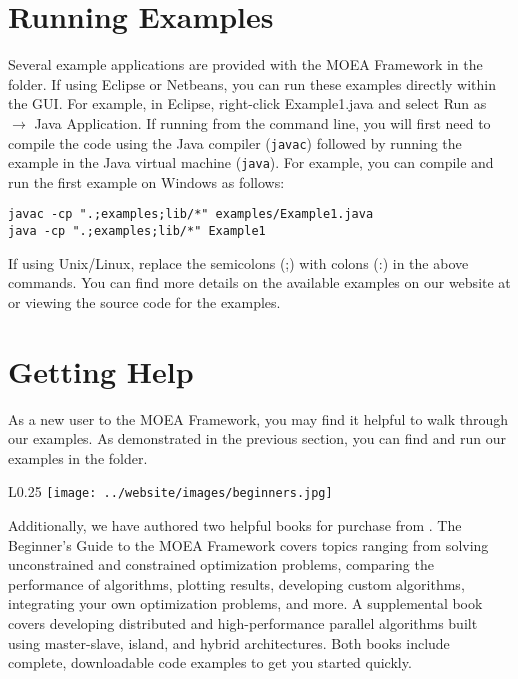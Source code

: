 \section{Running Examples}
Several example applications are provided with the MOEA Framework in the  folder.  If using Eclipse or Netbeans, you can run these examples directly within the GUI.  For example, in Eclipse, right-click Example1.java and select Run as $\rightarrow$ Java Application.  If running from the command line, you will first need to compile the code using the Java compiler (\texttt{javac}) followed by running the example in the Java virtual machine (\texttt{java}).  For example, you can compile and run the first example on Windows as follows:

\begin{lstlisting}[language=Plaintext]
javac -cp ".;examples;lib/*" examples/Example1.java
java -cp ".;examples;lib/*" Example1
\end{lstlisting}

\noindent
If using Unix/Linux, replace the semicolons (;) with colons (:) in the above commands.  You can find more details on the available examples on our website at  or viewing the source code for the examples.

\section{Getting Help}

As a new user to the MOEA Framework, you may find it helpful to walk through our examples.  As demonstrated in the previous section, you can find and run our examples in the  folder.

\begin{wrapfigure}{L}{0.25\textwidth}
\texttt{[image: ../website/images/beginners.jpg]}
\end{wrapfigure}

Additionally, we have authored two helpful books for purchase from .  The Beginner's Guide to the MOEA Framework covers topics ranging from solving unconstrained and constrained optimization problems, comparing the performance of algorithms, plotting results, developing custom algorithms, integrating your own optimization problems, and more.  A supplemental book covers developing distributed and high-performance parallel algorithms built using master-slave, island, and hybrid architectures.  Both books include complete, downloadable code examples to get you started quickly.


